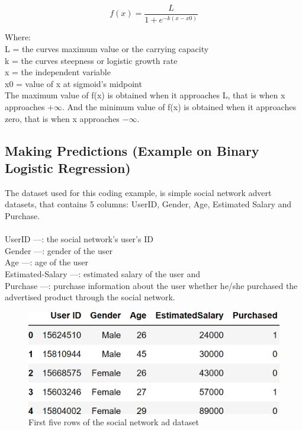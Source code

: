\documentclass[conference]{IEEEtran}
\begin{document}
\begin{equation} 
\label{equ2}
f(x) = \frac{L}{1 + e{^{-k(x-x0)}}}
\end{equation} 

Where:\\
L = the curves maximum value or the carrying capacity\\
k = the curves steepness or logistic growth rate\\
x = the independent variable\\
x0 = value of x at sigmoid's midpoint\\

The maximum value of f(x) is obtained when it approaches L, that is when x approaches $+\infty$. And the minimum value of f(x) is obtained when it approaches zero, that is when x approaches $-\infty$.

\subsection{Making Predictions (Example on Binary Logistic Regression)}
The dataset used for this coding example, is simple social network advert datasets, that contains 5 columns: UserID, Gender, Age, Estimated Salary and Purchase.\\
\\
UserID —: the social network's user's ID\\
Gender —: gender of the user\\
Age —: age of the user\\
Estimated-Salary —: estimated salary of the user and\\
Purchase —: purchase information about the user whether he/she purchased the advertised product through the social network.

\begin{figure}[h]
    \centering
    \includegraphics[scale=0.34]{figs/socialDataset.png}
    \caption{First five rows of the social network ad dataset}
    \label{dabc}        
\end{figure}
\end{document}
